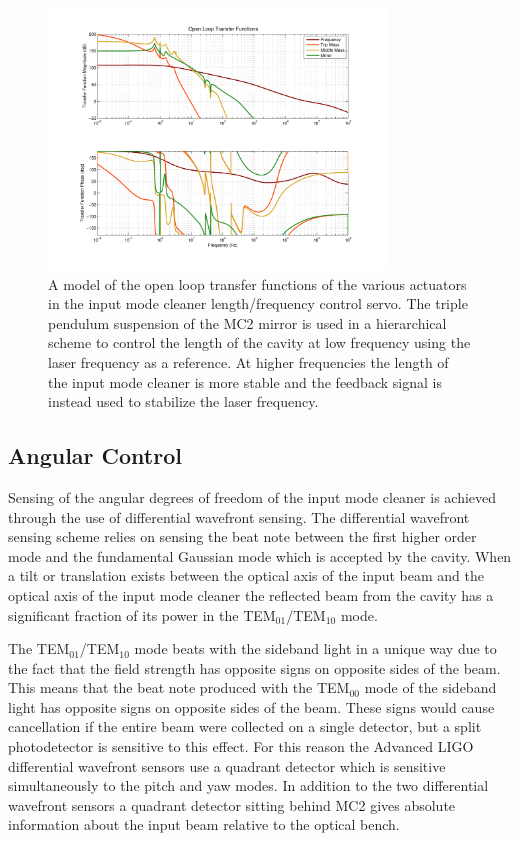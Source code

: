 \begin{figure}
	\centering
	\includegraphics[width=0.8\textwidth,trim = 2.5cm 2cm 2.5cm 1.5cm]{Open_Loop_Tfs.pdf}
	\caption{A model of the open loop transfer functions of the various actuators in the 
		input mode cleaner length/frequency control servo.  
		The triple pendulum suspension of the MC2 mirror is used in a hierarchical scheme to 
		control the length of the cavity at low frequency using the laser frequency as a reference.  
		At higher frequencies the length of the input mode cleaner is more stable and the feedback 
		signal is instead used to stabilize the laser frequency.}
	\label{fig:ControlLoops}
\end{figure}


\subsection{Angular Control}
Sensing of the angular degrees of freedom of the input mode cleaner is achieved through 
the use of differential wavefront sensing\cite{anderson_alignment_1984}\cite{fritschel_alignment_1998}.  
The differential wavefront sensing scheme relies on sensing the beat note between 
the first higher order mode and the fundamental Gaussian mode which is accepted by the cavity.  
When a tilt or translation exists between the optical axis of the input beam and the optical axis 
of the input mode cleaner the reflected beam from the cavity has a significant fraction of its 
power in the TEM$_{01}$/TEM$_{10}$ mode\cite{morrison_automatic_1994}.  

The TEM$_{01}$/TEM$_{10}$ mode beats with the sideband light in a unique way due to the 
fact that the field strength has opposite signs on opposite sides of the beam.  
This means that the beat note produced with the TEM$_{00}$ mode of the sideband light 
has opposite signs on opposite sides of the beam.  
These signs would cause cancellation if the entire beam were collected on a 
single detector, but a split photodetector is sensitive to this effect.  
For this reason the Advanced LIGO differential wavefront sensors use a quadrant detector 
which is sensitive simultaneously to the pitch and yaw modes.
In addition to the two differential wavefront sensors a quadrant detector sitting 
behind MC2 gives absolute information about the input beam relative to the optical bench.

